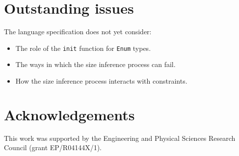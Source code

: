 \documentclass[10pt,twocolumn,a4paper]{article}
\newcommand{\code}[1]{\texttt{#1}}
\begin{document}
\section{Outstanding issues}

The language specification does not yet consider:
\begin{itemize}
  \item The role of the \code{init} function for \code{Enum} types.
  \item The ways in which the size inference process can fail.
  \item How the size inference process interacts with constraints.
\end{itemize}

\section{Acknowledgements}

This work was supported by the Engineering and Physical Sciences Research
Council (grant EP/R04144X/1).



\ifpdf
  \ifdefined\pdftrailerid
    \pdftrailerid{}
  \fi
\fi
\end{document}
